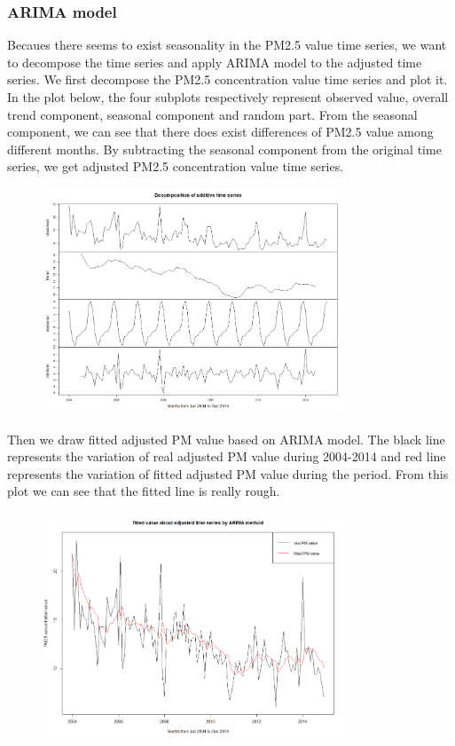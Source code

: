 \documentclass[10pt]{article}
\begin{document}
\subsubsection{ARIMA model}
Becaues there seems to exist seasonality in the PM2.5 value time series, we want to decompose the time series and apply ARIMA model to the adjusted time series. We first decompose the PM2.5 concentration value time series and plot it. In the plot below, the four subplots respectively represent observed value, overall trend component, seasonal component and random part. From the seasonal component, we can see that there does exist differences of PM2.5 value among different months. By subtracting the seasonal component from the original time series, we get adjusted PM2.5 concentration value time series.

\begin{figure}[ht!]
\centering
\includegraphics[width = 90mm]{ts4.png}
\end{figure}

Then we draw fitted adjusted PM value based on ARIMA model. The black line represents the variation of real adjusted PM value during 2004-2014 and red line represents the variation of fitted adjusted PM value during the period. From this plot we can see that the fitted line is really rough.

\begin{figure}[ht!]
\centering
\includegraphics[width = 90mm]{ts5.png}
\end{figure}
\end{document}
